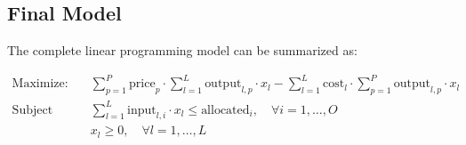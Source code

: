 \documentclass{article}
\begin{document}
\subsection*{Final Model}
The complete linear programming model can be summarized as:

\[
\begin{align*}
\text{Maximize:} & \quad \sum_{p=1}^{P} \text{price}_p \cdot \sum_{l=1}^{L} \text{output}_{l,p} \cdot x_l - \sum_{l=1}^{L} \text{cost}_l \cdot \sum_{p=1}^{P} \text{output}_{l,p} \cdot x_l  \\
\text{Subject to:} & \quad \sum_{l=1}^{L} \text{input}_{l,i} \cdot x_l \leq \text{allocated}_i, \quad \forall i = 1, \ldots, O \\
& \quad x_l \geq 0, \quad \forall l = 1, \ldots, L
\end{align*}
\]
\end{document}
